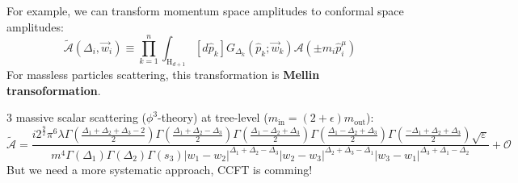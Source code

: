 \documentclass[aspectratio=169]{beamer}%
\begin{document}
	\begin{frame}
		For example, we can transform momentum space amplitudes to conformal space amplitudes:
		\begin{equation}
			\widetilde{\mathcal{A}}(\Delta_i,\vec{w}_i)\equiv\prod_{k=1}^n\int_{\mathrm{H}_{d+1}}[d\hat{p}_k]G_{\Delta_k}(\hat{p}_k;\vec{w}_k)\mathcal{A}(\pm m_i\hat{p}_i^\mu)
		\end{equation}
		For massless particles scattering, this transformation is \textbf{Mellin transoformation}.
		
		3 massive scalar scattering ($\phi^3$\mbox{-}theory) at tree-level ($m_\mathrm{in}=(2+\epsilon)m_\mathrm{out}$):
		\begin{equation}
			\widetilde{\mathcal{A}}=\frac{i2^{\frac92}\pi^6\lambda\Gamma(\frac{\Delta_1+\Delta_2+\Delta_3-2}{2})\Gamma(\frac{\Delta_1+\Delta_2-\Delta_3}{2})\Gamma(\frac{\Delta_1-\Delta_2+\Delta_3}{2})\Gamma(\frac{\Delta_1-\Delta_2+\Delta_3}{2})\Gamma(\frac{-\Delta_1+\Delta_2+\Delta_3}{2})\sqrt{\varepsilon}}{m^4\Gamma(\Delta_1)\Gamma(\Delta_2)\Gamma(s_3)|w_1-w_2|^{\Delta_1+\Delta_2-\Delta_3}|w_2-w_3|^{\Delta_2+\Delta_3-\Delta_1}|w_3-w_1|^{\Delta_3+\Delta_1-\Delta_2}}+\mathcal{O}
		\end{equation}
		But we need a more systematic approach, CCFT is comming!
	\end{frame}
\end{document}
